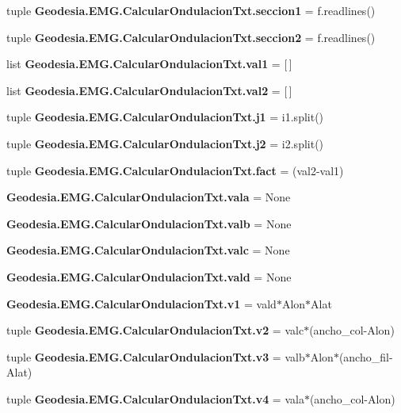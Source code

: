 \begin{DoxyCompactItemize}
tuple {\bf Geodesia.\-E\-M\-G.\-Calcular\-Ondulacion\-Txt.\-seccion1} = f.\-readlines()
\item 
tuple {\bf Geodesia.\-E\-M\-G.\-Calcular\-Ondulacion\-Txt.\-seccion2} = f.\-readlines()
\item 
list {\bf Geodesia.\-E\-M\-G.\-Calcular\-Ondulacion\-Txt.\-val1} = [$\,$]
\item 
list {\bf Geodesia.\-E\-M\-G.\-Calcular\-Ondulacion\-Txt.\-val2} = [$\,$]
\item 
tuple {\bf Geodesia.\-E\-M\-G.\-Calcular\-Ondulacion\-Txt.\-j1} = i1.\-split()
\item 
tuple {\bf Geodesia.\-E\-M\-G.\-Calcular\-Ondulacion\-Txt.\-j2} = i2.\-split()
\item 
tuple {\bf Geodesia.\-E\-M\-G.\-Calcular\-Ondulacion\-Txt.\-fact} = (val2-\/val1)
\item 
{\bf Geodesia.\-E\-M\-G.\-Calcular\-Ondulacion\-Txt.\-vala} = None
\item 
{\bf Geodesia.\-E\-M\-G.\-Calcular\-Ondulacion\-Txt.\-valb} = None
\item 
{\bf Geodesia.\-E\-M\-G.\-Calcular\-Ondulacion\-Txt.\-valc} = None
\item 
{\bf Geodesia.\-E\-M\-G.\-Calcular\-Ondulacion\-Txt.\-vald} = None
\item 
{\bf Geodesia.\-E\-M\-G.\-Calcular\-Ondulacion\-Txt.\-v1} = vald$\ast$Alon$\ast$Alat
\item 
tuple {\bf Geodesia.\-E\-M\-G.\-Calcular\-Ondulacion\-Txt.\-v2} = valc$\ast$(ancho\-\_\-col-\/Alon)
\item 
tuple {\bf Geodesia.\-E\-M\-G.\-Calcular\-Ondulacion\-Txt.\-v3} = valb$\ast$Alon$\ast$(ancho\-\_\-fil-\/Alat)
\item 
tuple {\bf Geodesia.\-E\-M\-G.\-Calcular\-Ondulacion\-Txt.\-v4} = vala$\ast$(ancho\-\_\-col-\/Alon)
\end{DoxyCompactItemize}
